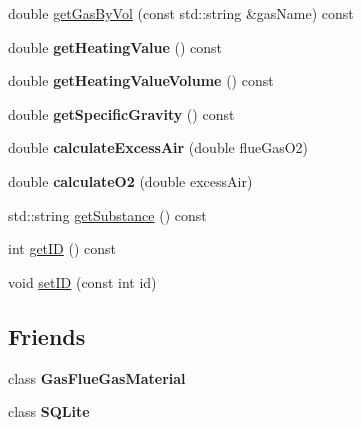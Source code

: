 \begin{DoxyCompactItemize}
\item 
double \hyperlink{class_gas_compositions_a2028a42c136e057a6153b7bfa68d63e6}{get\+Gas\+By\+Vol} (const std\+::string \&gas\+Name) const
\item 
\mbox{\label{class_gas_compositions_a7ebcdf1c991bd70f28eb845e45d62afd}} 
double {\bfseries get\+Heating\+Value} () const
\item 
\mbox{\label{class_gas_compositions_a78803a5c2508df3fd679dca0eb378480}} 
double {\bfseries get\+Heating\+Value\+Volume} () const
\item 
\mbox{\label{class_gas_compositions_a4f891acb4f8dc3992703155c6ba7ccb0}} 
double {\bfseries get\+Specific\+Gravity} () const
\item 
\mbox{\label{class_gas_compositions_a4f6408254477960648440da460099e2d}} 
double {\bfseries calculate\+Excess\+Air} (double flue\+Gas\+O2)
\item 
\mbox{\label{class_gas_compositions_afc573b87fb7e7b99803b22470c402592}} 
double {\bfseries calculate\+O2} (double excess\+Air)
\item 
std\+::string \hyperlink{class_gas_compositions_abad9554bca9b68cd970eae11bdd3c505}{get\+Substance} () const
\item 
int \hyperlink{class_gas_compositions_a9668decdb2b5065c8ee3c59c207b9d51}{get\+ID} () const
\item 
void \hyperlink{class_gas_compositions_a9fc3ebfcbda7134b67ed76a39b4c94cc}{set\+ID} (const int id)
\end{DoxyCompactItemize}
\subsection*{Friends}
\begin{DoxyCompactItemize}
\item 
\mbox{\label{class_gas_compositions_a399a12526ca1c801e9b82aef418254f6}} 
class {\bfseries Gas\+Flue\+Gas\+Material}
\item 
\mbox{\label{class_gas_compositions_a0102f3b3c0cbf96db6c49f071fa5e7cc}} 
class {\bfseries S\+Q\+Lite}
\end{DoxyCompactItemize}


